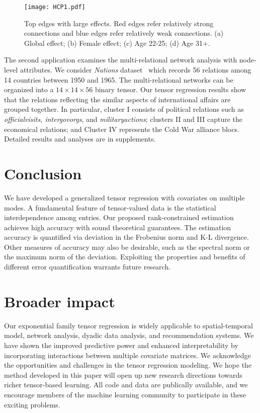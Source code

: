 \documentclass{article}
\theoremstyle{plain}
\theoremstyle{definition}
\begin{document}
\begin{figure}[ht]
\centering
\texttt{[image: HCP1.pdf]}
\caption{\small{Top edges with large effects. Red edges refer relatively strong connections and blue edges refer relatively weak connections. (a) Global effect; (b) Female effect; (c) Age 22-25; (d) Age 31+.} }\label{fig:brain}
\end{figure}
The second application examines the multi-relational network analysis with node-level attributes. We consider \emph{Nations} dataset~\cite{nickel2011three} which records 56 relations among 14 countries between 1950 and 1965. The multi-relational networks can be organized into a $14 \times 14 \times 56$ binary tensor. Our tensor regression results show that the relations reflecting the similar aspects of international affairs are grouped together. In particular, cluster I consists of political relations such as \emph{officialvisits, intergovorgs}, and \emph{militaryactions}; clusters II and III capture the economical relations; and Cluster IV represents the Cold War alliance blocs.  Detailed results and analyses are in supplements.

\vspace{-.1cm}
\section{Conclusion}
\vspace{-.1cm}
We have developed a generalized tensor regression with covariates on multiple modes. A fundamental feature of tensor-valued data is the statistical interdependence among entries. Our proposed rank-constrained estimation achieves high accuracy with sound theoretical guarantees. The estimation accuracy is quantified via deviation in the Frobenius norm and K-L divergence. Other measures of accuracy may also be desirable, such as the spectral norm or the maximum norm of the deviation. Exploiting the properties and benefits of different error quantification warrants future research.

\section*{Broader impact}
Our exponential family tensor regression is widely applicable to spatial-temporal model, network analysis, dyadic data analysis, and recommendation systems. We have shown the improved predictive power and enhanced interpretability by incorporating interactions between multiple covariate matrices. We acknowledge the opportunities and challenges in the tensor regression modeling. We hope the method developed in this paper will open up new research directions towards richer tensor-based learning. All code and data are publically available, and we encourage members of the machine learning community to participate in these exciting problems. 

\medskip



\end{document}
